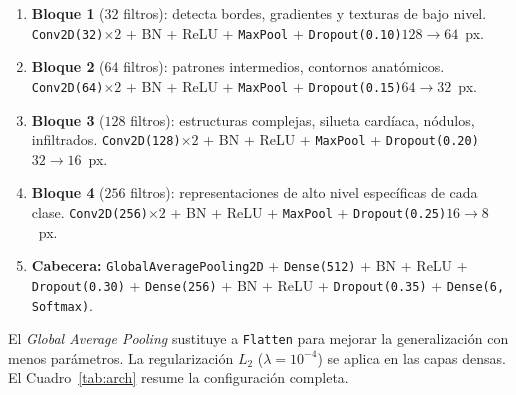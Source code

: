 \documentclass[10pt,twocolumn]{article}
\begin{document}
\begin{enumerate}[leftmargin=*,noitemsep,topsep=2pt]
  \item \textbf{Bloque 1} ($32$ filtros): detecta bordes, gradientes y
        texturas de bajo nivel.
        \texttt{Conv2D(32)}$\times2$ + BN + ReLU + \texttt{MaxPool} +
        \texttt{Dropout(0.10)}\quad $128\to64$~px.
  \item \textbf{Bloque 2} ($64$ filtros): patrones intermedios,
        contornos anatómicos.
        \texttt{Conv2D(64)}$\times2$ + BN + ReLU + \texttt{MaxPool} +
        \texttt{Dropout(0.15)}\quad $64\to32$~px.
  \item \textbf{Bloque 3} ($128$ filtros): estructuras complejas,
        silueta cardíaca, nódulos, infiltrados.
        \texttt{Conv2D(128)}$\times2$ + BN + ReLU + \texttt{MaxPool} +
        \texttt{Dropout(0.20)}\quad $32\to16$~px.
  \item \textbf{Bloque 4} ($256$ filtros): representaciones de alto
        nivel específicas de cada clase.
        \texttt{Conv2D(256)}$\times2$ + BN + ReLU + \texttt{MaxPool} +
        \texttt{Dropout(0.25)}\quad $16\to8$~px.
  \item \textbf{Cabecera:} \texttt{GlobalAveragePooling2D} +
        \texttt{Dense(512)} + BN + ReLU + \texttt{Dropout(0.30)} +
        \texttt{Dense(256)} + BN + ReLU + \texttt{Dropout(0.35)} +
        \texttt{Dense(6, Softmax)}.
\end{enumerate}

El \textit{Global Average Pooling} sustituye a \texttt{Flatten} para
mejorar la generalización con menos parámetros.  La regularización
$L_2$ ($\lambda=10^{-4}$) se aplica en las capas densas.  El
Cuadro~\ref{tab:arch} resume la configuración completa.
\end{document}
